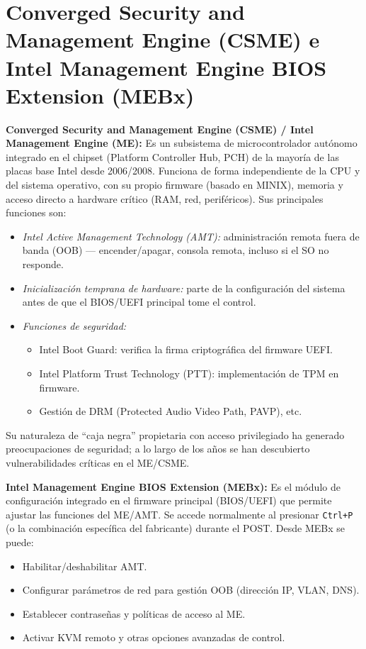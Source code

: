 \newpage

\section{Converged Security and Management Engine (CSME) e Intel Management Engine BIOS Extension (MEBx)}

\textbf{Converged Security and Management Engine (CSME) / Intel Management Engine (ME):}  
Es un subsistema de microcontrolador autónomo integrado en el chipset (Platform Controller Hub, PCH) de la mayoría de las placas base Intel desde 2006/2008. Funciona de forma independiente de la CPU y del sistema operativo, con su propio firmware (basado en MINIX), memoria y acceso directo a hardware crítico (RAM, red, periféricos). Sus principales funciones son:
\begin{itemize}[noitemsep]
  \item \emph{Intel Active Management Technology (AMT):} administración remota fuera de banda (OOB) — encender/apagar, consola remota, incluso si el SO no responde.
  \item \emph{Inicialización temprana de hardware:} parte de la configuración del sistema antes de que el BIOS/UEFI principal tome el control.
  \item \emph{Funciones de seguridad:}  
    \begin{itemize}[noitemsep]
      \item Intel Boot Guard: verifica la firma criptográfica del firmware UEFI.
      \item Intel Platform Trust Technology (PTT): implementación de TPM en firmware.
      \item Gestión de DRM (Protected Audio Video Path, PAVP), etc.
    \end{itemize}
\end{itemize}
Su naturaleza de “caja negra” propietaria con acceso privilegiado ha generado preocupaciones de seguridad; a lo largo de los años se han descubierto vulnerabilidades críticas en el ME/CSME.

\medskip
\textbf{Intel Management Engine BIOS Extension (MEBx):}  
Es el módulo de configuración integrado en el firmware principal (BIOS/UEFI) que permite ajustar las funciones del ME/AMT. Se accede normalmente al presionar \texttt{Ctrl+P} (o la combinación específica del fabricante) durante el POST. Desde MEBx se puede:
\begin{itemize}[noitemsep]
  \item Habilitar/deshabilitar AMT.
  \item Configurar parámetros de red para gestión OOB (dirección IP, VLAN, DNS).
  \item Establecer contraseñas y políticas de acceso al ME.
  \item Activar KVM remoto y otras opciones avanzadas de control.
\end{itemize}
